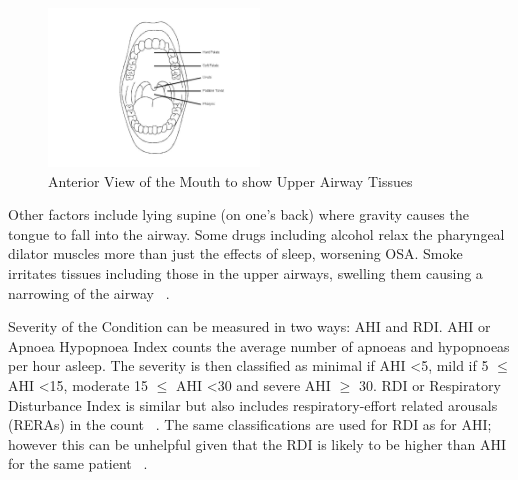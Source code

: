 \begin{figure}[h]
\centering
\includegraphics[width=0.5\textwidth]{drawings/Anterior-View-Mouth}
\caption{Anterior View of the Mouth to show Upper Airway Tissues~\cite{anteriormouth}}
\label{fig:Anterior-View-Mouth}
\end{figure}

Other factors include lying supine (on one’s back) where gravity causes the tongue to fall into the airway. Some drugs including alcohol relax the pharyngeal dilator muscles more than just the effects of sleep, worsening OSA. Smoke irritates tissues including those in the upper airways, swelling them causing a narrowing of the airway ~\cite{apneosotherfactors}.

 Severity of the Condition can be measured in two ways: AHI and RDI. AHI or Apnoea Hypopnoea Index counts the average number of apnoeas and hypopnoeas per hour asleep. The severity is then classified as minimal if AHI \textless 5, mild if 5 $\leq$ AHI \textless 15, moderate 15 $\leq$ AHI \textless 30 and severe AHI $\geq$ 30. RDI or Respiratory Disturbance Index is similar but also includes respiratory-effort related arousals (RERAs) in the count ~\cite{AHI}. The same classifications are used for RDI as for AHI; however this can be unhelpful given that the RDI is likely to be higher than AHI for the same patient ~\cite{epstein2009clinical}.

